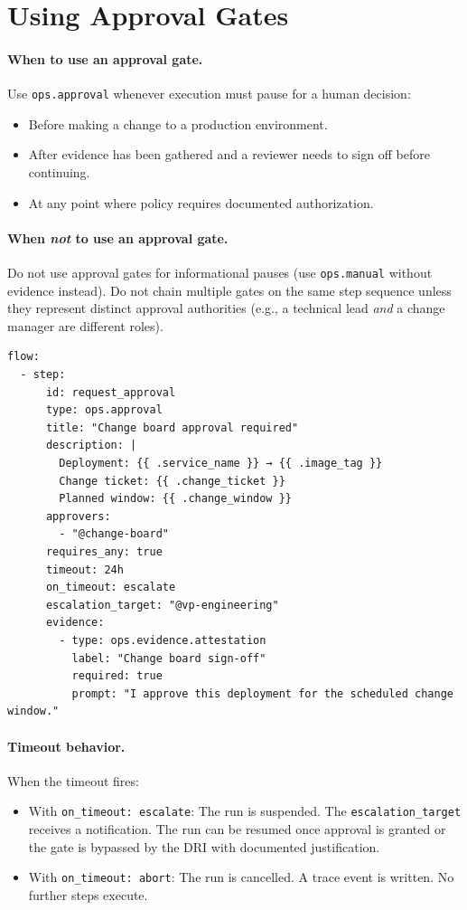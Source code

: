 \section{Using Approval Gates}
\label{sec:authoring-approval}

\paragraph{When to use an approval gate.}
Use \texttt{ops.approval} whenever execution must pause for a human decision:
\begin{itemize}
  \item Before making a change to a production environment.
  \item After evidence has been gathered and a reviewer needs to sign off before continuing.
  \item At any point where policy requires documented authorization.
\end{itemize}

\paragraph{When \emph{not} to use an approval gate.}
Do not use approval gates for informational pauses (use \texttt{ops.manual} without evidence
instead). Do not chain multiple gates on the same step sequence unless they represent distinct
approval authorities (e.g., a technical lead \emph{and} a change manager are different roles).

\begin{verbatim}
flow:
  - step:
      id: request_approval
      type: ops.approval
      title: "Change board approval required"
      description: |
        Deployment: {{ .service_name }} → {{ .image_tag }}
        Change ticket: {{ .change_ticket }}
        Planned window: {{ .change_window }}
      approvers:
        - "@change-board"
      requires_any: true
      timeout: 24h
      on_timeout: escalate
      escalation_target: "@vp-engineering"
      evidence:
        - type: ops.evidence.attestation
          label: "Change board sign-off"
          required: true
          prompt: "I approve this deployment for the scheduled change window."
\end{verbatim}

\paragraph{Timeout behavior.} When the timeout fires:
\begin{itemize}
  \item With \texttt{on\_timeout: escalate}: The run is suspended. The
    \texttt{escalation\_target} receives a notification. The run can be resumed once approval
    is granted or the gate is bypassed by the DRI with documented justification.
  \item With \texttt{on\_timeout: abort}: The run is cancelled. A trace event is written.
    No further steps execute.
\end{itemize}

